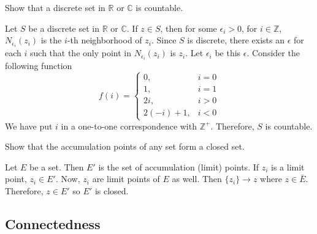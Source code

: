 \begin{exercise}[ref = \arabic{exercisei}]
  Show that a discrete set in \(\mathbb{R}\) or \(\mathbb{C}\) is countable.
  \par\smallskip
  Let \(S\) be a discrete set in \(\mathbb{R}\) or \(\mathbb{C}\).
  If \(z\in S\), then for some \(\epsilon_i > 0\), for \(i\in\mathbb{Z}\),
  \(N_{\epsilon_i}(z_i)\) is the \(i\)-th neighborhood of \(z_i\).
  Since \(S\) is discrete, there exists an \(\epsilon\) for each \(i\) such
  that the only point in \(N_{\epsilon_i}(z_i)\) is \(z_i\).
  Let \(\epsilon_i\) be this \(\epsilon\). 
  Consider the following function
  \[
    f(i) =
    \begin{cases}
      0, & i = 0\\
      1, & i = 1\\
      2i, & i > 0\\
      2(-i) + 1, & i < 0
    \end{cases}
  \]
  We have put \(i\) in a one-to-one correspondence with \(\mathbb{Z}^+\).
  Therefore, \(S\) is countable.
\item
  Show that the accumulation points of any set form a closed set.
  \par\smallskip
  Let \(E\) be a set.
  Then \(E'\) is the set of accumulation (limit) points.
  If \(z_i\) is a limit point, \(z_i\in E'\).
  Now, \(z_i\) are limit points of \(E\) as well.
  Then \(\{z_i\}\to z\) where \(z\in\bar{E}\).
  Therefore, \(z\in E'\) so \(E'\) is closed.
\end{exercise}

\subsection{Connectedness}

